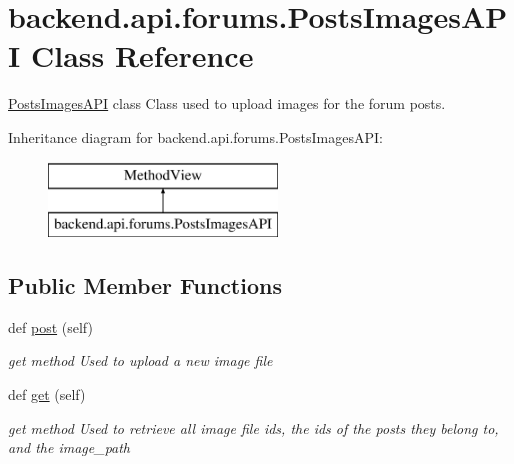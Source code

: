 \hypertarget{classbackend_1_1api_1_1forums_1_1_posts_images_a_p_i}{}\section{backend.\+api.\+forums.\+Posts\+Images\+A\+P\+I Class Reference}
\label{classbackend_1_1api_1_1forums_1_1_posts_images_a_p_i}


\hyperlink{classbackend_1_1api_1_1forums_1_1_posts_images_a_p_i}{Posts\+Images\+A\+P\+I} class Class used to upload images for the forum posts.  


Inheritance diagram for backend.\+api.\+forums.\+Posts\+Images\+A\+P\+I\+:\begin{figure}[H]
\begin{center}
\leavevmode
\includegraphics[height=2.000000cm]{classbackend_1_1api_1_1forums_1_1_posts_images_a_p_i}
\end{center}
\end{figure}
\subsection*{Public Member Functions}
\begin{DoxyCompactItemize}
\item 
\hypertarget{classbackend_1_1api_1_1forums_1_1_posts_images_a_p_i_a6cb568b629a79986bb837429df6ea377}{}def \hyperlink{classbackend_1_1api_1_1forums_1_1_posts_images_a_p_i_a6cb568b629a79986bb837429df6ea377}{post} (self)\label{classbackend_1_1api_1_1forums_1_1_posts_images_a_p_i_a6cb568b629a79986bb837429df6ea377}

\begin{DoxyCompactList}\small\item\em get method Used to upload a new image file \end{DoxyCompactList}\item 
\hypertarget{classbackend_1_1api_1_1forums_1_1_posts_images_a_p_i_a6882fa2ea7a8c597206e5ff4af0d477c}{}def \hyperlink{classbackend_1_1api_1_1forums_1_1_posts_images_a_p_i_a6882fa2ea7a8c597206e5ff4af0d477c}{get} (self)\label{classbackend_1_1api_1_1forums_1_1_posts_images_a_p_i_a6882fa2ea7a8c597206e5ff4af0d477c}

\begin{DoxyCompactList}\small\item\em get method Used to retrieve all image file ids, the ids of the posts they belong to, and the image\+\_\+path \end{DoxyCompactList}\end{DoxyCompactItemize}


